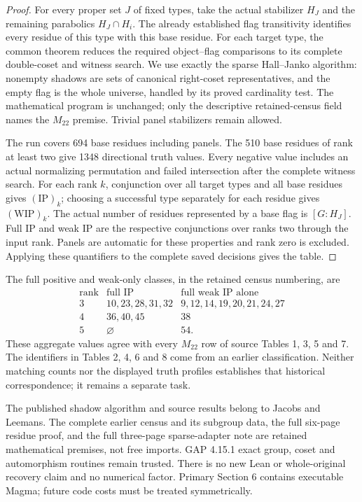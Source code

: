 \documentclass[11pt,a4paper]{article}
\begin{document}
\begin{proof}
For every proper set $J$ of fixed types, take the actual stabilizer
$H_J$ and the remaining parabolics $H_J\cap H_i$. The already established
flag transitivity identifies every residue of this type with this base
residue. For each target type, the common theorem reduces the required
object--flag comparisons to its complete double-coset and witness search.
We use exactly the sparse Hall--Janko algorithm: nonempty shadows are
sets of canonical right-coset representatives, and the empty flag is the
whole universe, handled by its proved cardinality test. The mathematical
program is unchanged; only the descriptive retained-census field names
the $M_{22}$ premise. Trivial panel stabilizers remain allowed.

The run covers 694 base residues including panels. The 510 base residues
of rank at least two give 1348 directional truth values. Every negative
value includes an actual normalizing permutation and failed intersection
after the complete witness search. For each rank $k$, conjunction over
all target types and all base residues gives $(\mathrm{IP})_k$; choosing a
successful type separately for each residue gives $(\mathrm{WIP})_k$.
The actual number of residues represented by a base flag is $[G:H_J]$.
Full IP and weak IP are the respective conjunctions over ranks two through
the input rank. Panels are automatic for these properties and rank zero
is excluded. Applying these quantifiers to the complete saved decisions
gives the table.
\end{proof}
The full positive and weak-only classes, in the retained census numbering,
are
\[
\begin{array}{c|l|l}
\text{rank}&\text{full IP}&\text{full weak IP alone}\\\hline
3&10,23,28,31,32&9,12,14,19,20,21,24,27\\
4&36,40,45&38\\
5&\varnothing&54.
\end{array}
\]
These aggregate values agree with every $M_{22}$ row of source Tables 1,
3, 5 and 7. The identifiers in Tables 2, 4, 6 and 8 come from an earlier
classification. Neither matching counts nor the displayed truth profiles
establishes that historical correspondence; it remains a separate task.

The published shadow algorithm and source results belong to Jacobs and
Leemans. The complete earlier census and its subgroup data, the full
six-page residue proof, and the full three-page sparse-adapter note are
retained mathematical premises, not free imports. GAP 4.15.1 exact group,
coset and automorphism routines remain trusted. There is no new Lean or
whole-original recovery claim and no numerical factor. Primary Section 6
contains executable Magma; future code costs must be treated symmetrically.
\end{document}
